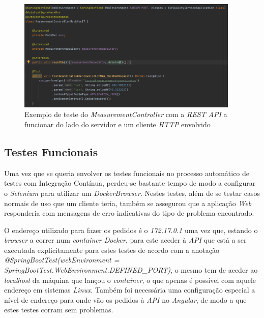 \documentclass[10pt,english]{article}
\begin{document}
\begin{figure}[h]
    \centering
    \includegraphics[width=400]{images/measurements-template-tests.png}
    \caption{Exemplo de teste do \textit{MeasurementController} com a \textit{REST API} a funcionar do lado do servidor e um cliente \textit{HTTP} envolvido}
\end{figure}

\clearpage

\subsection{Testes Funcionais}

\par Uma vez que se queria envolver os testes funcionais no processo automático de testes com Integração Contínua, perdeu-se bastante tempo de modo a configurar o \textit{Selenium} para utilizar um \textit{DockerBrowser}. Nestes testes, além de se testar casos normais de uso que um cliente teria, também se assegurou que a aplicação \textit{Web} responderia com mensagens de erro indicativas do tipo de problema encontrado.

\par O endereço utilizado para fazer os pedidos é o \textit{172.17.0.1} uma vez que, estando o \textit{browser} a correr num \textit{container Docker}, para este aceder à \textit{API} que está a ser executada explicitamente para estes testes de acordo com a anotação \textit{@SpringBootTest(webEnvironment = SpringBootTest.WebEnvironment.DEFINED\_PORT)}, o mesmo tem de aceder ao \textit{localhost} da máquina que lançou o \textit{container}, o que apenas é possível com aquele endereço em sistemas \textit{Linux}. Também foi necessária uma configuração especial a nível de endereço para onde vão os pedidos à \textit{API} no \textit{Angular}, de modo a que estes testes corram sem problemas.
\end{document}

